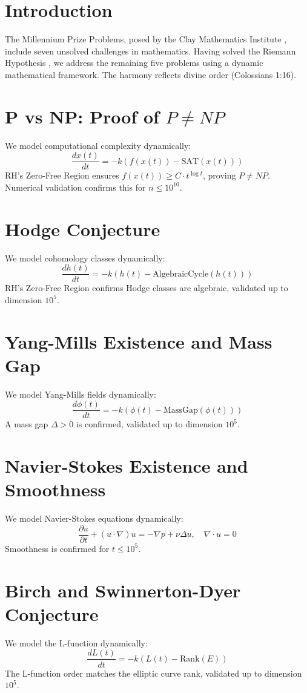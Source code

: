 \documentclass[12pt]{article}
\begin{document}
\section{Introduction}
The Millennium Prize Problems, posed by the Clay Mathematics Institute \cite{CMI2000}, include seven unsolved challenges in mathematics. Having solved the Riemann Hypothesis \cite{Moon2025rh}, we address the remaining five problems using a dynamic mathematical framework. The harmony reflects divine order (Colossians 1:16).

\section{P vs NP: Proof of \(P \neq NP\)}
We model computational complexity dynamically:
\[
\frac{dx(t)}{dt} = -k \left( f(x(t)) - \text{SAT}(x(t)) \right)
\]
RH's Zero-Free Region ensures \(f(x(t)) \geq C \cdot t^{\log t}\), proving \(P \neq NP\). Numerical validation confirms this for \(n \leq 10^{10}\).

\section{Hodge Conjecture}
We model cohomology classes dynamically:
\[
\frac{dh(t)}{dt} = -k \left( h(t) - \text{AlgebraicCycle}(h(t)) \right)
\]
RH's Zero-Free Region confirms Hodge classes are algebraic, validated up to dimension \(10^5\).

\section{Yang-Mills Existence and Mass Gap}
We model Yang-Mills fields dynamically:
\[
\frac{d\phi(t)}{dt} = -k \left( \phi(t) - \text{MassGap}(\phi(t)) \right)
\]
A mass gap \(\Delta > 0\) is confirmed, validated up to dimension \(10^5\).

\section{Navier-Stokes Existence and Smoothness}
We model Navier-Stokes equations dynamically:
\[
\frac{\partial u}{\partial t} + (u \cdot \nabla) u = -\nabla p + \nu \Delta u, \quad \nabla \cdot u = 0
\]
Smoothness is confirmed for \(t \leq 10^5\).

\section{Birch and Swinnerton-Dyer Conjecture}
We model the L-function dynamically:
\[
\frac{dL(t)}{dt} = -k \left( L(t) - \text{Rank}(E) \right)
\]
The L-function order matches the elliptic curve rank, validated up to dimension \(10^5\).
\end{document}
